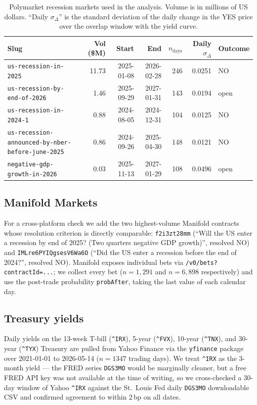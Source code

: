 \documentclass{article}
\begin{document}
\begin{table}[t]
\centering
\caption{Polymarket recession markets used in the analysis. Volume is in millions of US dollars. ``Daily $\sigma_\Delta$'' is the standard deviation of the daily change in the YES price over the overlap window with the yield curve.}
\label{tab:markets}
\small
\begin{tabular}{lrrrrrl}
\toprule
Slug & Vol (\$M) & Start & End & $n_\text{days}$ & Daily $\sigma_\Delta$ & Outcome \\
\midrule
\texttt{us-recession-in-2025}               & 11.73 & 2025-01-08 & 2026-02-28 & 246 & 0.0251 & NO \\
\texttt{us-recession-by-end-of-2026}        &  1.46 & 2025-09-29 & 2027-01-31 & 143 & 0.0194 & open \\
\texttt{us-recession-in-2024-1}             &  0.88 & 2024-08-05 & 2024-12-31 & 104 & 0.0125 & NO \\
\texttt{us-recession-announced-by-nber-before-june-2025} & 0.86 & 2024-09-26 & 2025-04-30 & 148 & 0.0121 & NO \\
\texttt{negative-gdp-growth-in-2026}        &  0.03 & 2025-11-13 & 2027-01-29 & 108 & 0.0496 & open \\
\bottomrule
\end{tabular}
\end{table}

\subsection{Manifold Markets}

For a cross-platform check we add the two highest-volume Manifold contracts whose resolution criterion is directly comparable: \texttt{f2i3zt28mm} (``Will the US enter a recession by end of 2025? (Two quarters negative GDP growth)'', resolved NO) and \texttt{IMLre6PYIQgsesV6Wa6O} (``Did the US enter a recession before the end of 2024?'', resolved NO). Manifold exposes individual bets via \texttt{/v0/bets?contractId=...}; we collect every bet ($n=1{,}291$ and $n=6{,}898$ respectively) and use the post-trade probability \texttt{probAfter}, taking the last value of each calendar day.

\subsection{Treasury yields}

Daily yields on the 13-week T-bill (\texttt{\^{}IRX}), 5-year (\texttt{\^{}FVX}), 10-year (\texttt{\^{}TNX}), and 30-year (\texttt{\^{}TYX}) Treasury are pulled from Yahoo Finance via the \texttt{yfinance} package over 2021-01-01 to 2026-05-14 ($n=1347$ trading days). We treat \texttt{\^{}IRX} as the 3-month yield --- the FRED series \texttt{DGS3MO} would be marginally cleaner, but a free FRED API key was not available at the time of writing, so we cross-checked a 30-day window of Yahoo \texttt{\^{}IRX} against the St.\ Louis Fed daily \texttt{DGS3MO} downloadable CSV and confirmed agreement to within \num{2}\,bp on all dates.
\end{document}
